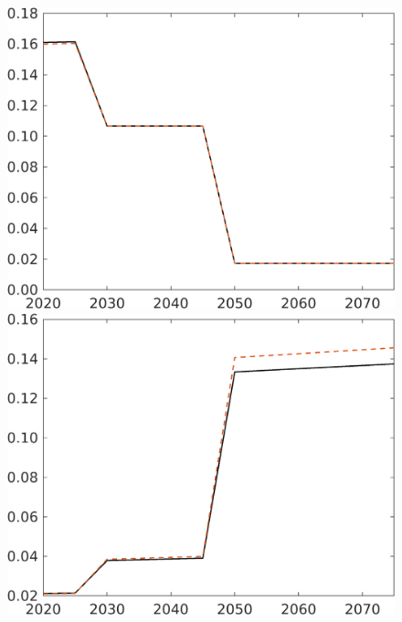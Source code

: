 \begin{figure}[h!!]
\begin{minipage}[]{0.32\textwidth}
	\includegraphics[width=1\textwidth]{../../codding_model/own_basedOnFried/optimalPol_elastS_DisuSci/figures/all_1705/comp_notaul_OPT_T_NoTaus_F_spillover0_sep1_BN0_ineq0_etaa0.79.png}
\end{minipage}
\begin{minipage}[]{0.32\textwidth}
	\includegraphics[width=1\textwidth]{../../codding_model/own_basedOnFried/optimalPol_elastS_DisuSci/figures/all_1705/comp_notaul_OPT_T_NoTaus_G_spillover0_sep1_BN0_ineq0_etaa0.79.png}

\end{minipage}
\end{figure}
